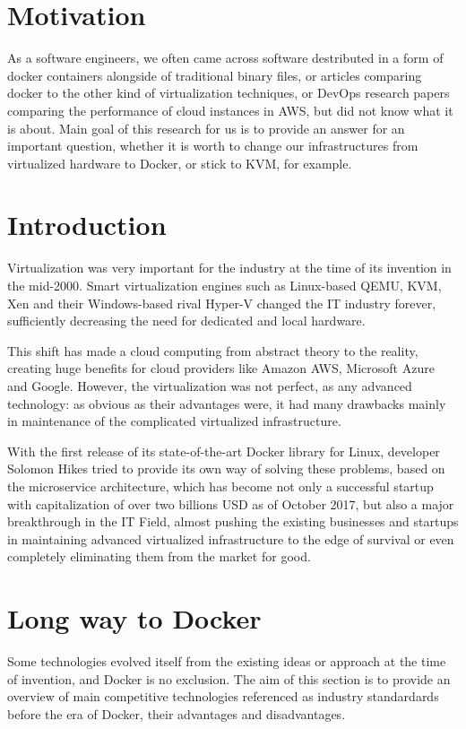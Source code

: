 
\section{Motivation}

As a software engineers,
we often came across software destributed
in a form of docker containers alongside
of traditional binary files,
or articles comparing docker to the other kind of virtualization techniques,
or DevOps research papers comparing the performance of cloud instances in AWS,
but did not know what it is about.
Main goal of this research for us is to provide an answer
for an important question, whether it is worth
to change our infrastructures
from virtualized hardware to Docker, or stick to KVM, for example.

\section{Introduction}

Virtualization was very important for the industry at the time of its invention in the mid-2000.
Smart virtualization engines such as Linux-based QEMU, KVM, Xen
and their Windows-based rival Hyper-V changed the IT industry forever,
sufficiently decreasing the need for dedicated and local hardware.

This shift has made a cloud computing from abstract theory to the reality,
creating huge benefits for cloud providers like Amazon AWS, Microsoft Azure and Google.
However, the virtualization was not perfect, as any advanced technology:
as obvious as their advantages were,
it had many drawbacks mainly in maintenance of the complicated virtualized infrastructure.

With the first release of its state-of-the-art Docker library for Linux,
developer Solomon Hikes tried to provide its own way of solving these problems,
based on the microservice architecture, which has become not only a successful startup
with capitalization of over two billions USD as of October 2017,
but also a major breakthrough in the IT Field, almost pushing the existing
businesses and startups in maintaining advanced virtualized infrastructure
to the edge of survival or even completely eliminating them from the market for good.

\section{Long way to Docker}

Some technologies evolved itself from the existing ideas or approach at the time of invention, and Docker is no exclusion.
The aim of this section is to provide an overview of main competitive
technologies referenced as industry standardards before the era of Docker, their advantages and disadvantages.

